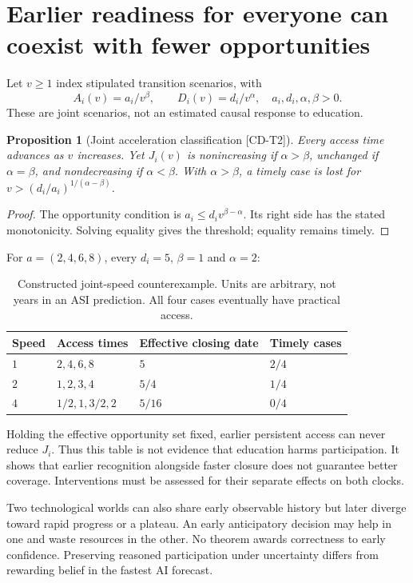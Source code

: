\documentclass[11pt,a4paper]{article}
\newtheorem{proposition}[theorem]{Proposition}
\theoremstyle{definition}\newtheorem{definition}{Definition}
\newcommand{\tagid}[1]{\textnormal{\textsf{[#1]}}}
\begin{document}
\section{Earlier readiness for everyone can coexist with fewer opportunities}
\label{sec:acceleration}
Let $v\ge1$ index stipulated transition scenarios, with
\begin{equation}
A_i(v)=a_i/v^\beta,\qquad D_i(v)=d_i/v^\alpha,
\quad a_i,d_i,\alpha,\beta>0.
\label{eq:speed}
\end{equation}
These are joint scenarios, not an estimated causal response to education.
\begin{proposition}[Joint acceleration classification \tagid{CD-T2}]
Every access time advances as $v$ increases. Yet $J_i(v)$ is nonincreasing if $\alpha>\beta$, unchanged if $\alpha=\beta$, and nondecreasing if $\alpha<\beta$. With $\alpha>\beta$, a timely case is lost for $v>(d_i/a_i)^{1/(\alpha-\beta)}$.
\end{proposition}
\begin{proof}
The opportunity condition is $a_i\le d_iv^{\beta-\alpha}$. Its right side has the stated monotonicity. Solving equality gives the threshold; equality remains timely.
\end{proof}
For $a=(2,4,6,8)$, every $d_i=5$, $\beta=1$ and $\alpha=2$:
\begin{table}[ht]
\centering\small
\caption{Constructed joint-speed counterexample. Units are arbitrary, not years in an ASI prediction. All four cases eventually have practical access.}
\begin{tabular}{@{}llll@{}}\toprule
Speed & Access times & Effective closing date & Timely cases\\\midrule
$1$ & $2,4,6,8$ & $5$ & $2/4$\\
$2$ & $1,2,3,4$ & $5/4$ & $1/4$\\
$4$ & $1/2,1,3/2,2$ & $5/16$ & $0/4$\\\bottomrule
\end{tabular}
\end{table}
Holding the effective opportunity set fixed, earlier persistent access can never reduce $J_i$. Thus this table is not evidence that education harms participation. It shows that earlier recognition alongside faster closure does not guarantee better coverage. Interventions must be assessed for their separate effects on both clocks.

Two technological worlds can also share early observable history but later diverge toward rapid progress or a plateau. An early anticipatory decision may help in one and waste resources in the other. No theorem awards correctness to early confidence. Preserving reasoned participation under uncertainty differs from rewarding belief in the fastest AI forecast.
\end{document}
